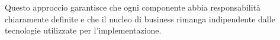 \documentclass[10pt]{article}
\begin{document}
    Questo approccio garantisce che ogni componente abbia responsabilità chiaramente definite e che il nucleo di business rimanga indipendente dalle tecnologie utilizzate per l'implementazione.


    


\end{document}
